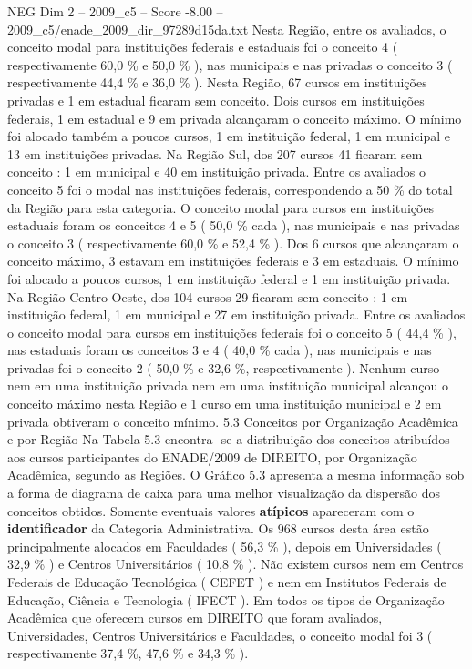 \begin{textsample}{NEG Dim 2 – 2009\_c5 – Score -8.00 – 2009\_c5/enade\_2009\_dir\_97289d15da.txt}
Nesta Região, entre os avaliados, o conceito modal para instituições federais e estaduais foi o conceito 4 ( respectivamente 60,0 \% e 50,0 \% ), nas municipais e nas privadas o conceito 3 ( respectivamente 44,4 \% e 36,0 \% ).
Nesta Região, 67 cursos em instituições privadas e 1 em estadual ficaram sem conceito.
Dois cursos em instituições federais, 1 em estadual e 9 em privada alcançaram o conceito máximo.
O mínimo foi alocado também a poucos cursos, 1 em instituição federal, 1 em municipal e 13 em instituições privadas.
Na Região Sul, dos 207 cursos 41 ficaram sem conceito : 1 em municipal e 40 em instituição privada.
Entre os avaliados o conceito 5 foi o modal nas instituições federais, correspondendo a 50 \% do total da Região para esta categoria.
O conceito modal para cursos em instituições estaduais foram os conceitos 4 e 5 ( 50,0 \% cada ), nas municipais e nas privadas o conceito 3 ( respectivamente 60,0 \% e 52,4 \% ).
Dos 6 cursos que alcançaram o conceito máximo, 3 estavam em instituições federais e 3 em estaduais.
O mínimo foi alocado a poucos cursos, 1 em instituição federal e 1 em instituição privada.
Na Região Centro-Oeste, dos 104 cursos 29 ficaram sem conceito : 1 em instituição federal, 1 em municipal e 27 em instituição privada.
Entre os avaliados o conceito modal para cursos em instituições federais foi o conceito 5 ( 44,4 \% ), nas estaduais foram os conceitos 3 e 4 ( 40,0 \% cada ), nas municipais e nas privadas foi o conceito 2 ( 50,0 \% e 32,6 \%, respectivamente ).
Nenhum curso nem em uma instituição privada nem em uma instituição municipal alcançou o conceito máximo nesta Região e 1 curso em uma instituição municipal e 2 em privada obtiveram o conceito mínimo. 5.3 Conceitos por Organização Acadêmica e por Região Na Tabela 5.3 encontra -se a distribuição dos conceitos atribuídos aos cursos participantes do ENADE/2009 de DIREITO, por Organização Acadêmica, segundo as Regiões.
O Gráfico 5.3 apresenta a mesma informação sob a forma de diagrama de caixa para uma melhor visualização da dispersão dos conceitos obtidos.
Somente eventuais valores \textbf{atípicos} apareceram com o \textbf{identificador} da Categoria Administrativa.
Os 968 cursos desta área estão principalmente alocados em Faculdades ( 56,3 \% ), depois em Universidades ( 32,9 \% ) e Centros Universitários ( 10,8 \% ).
Não existem cursos nem em Centros Federais de Educação Tecnológica ( CEFET ) e nem em Institutos Federais de Educação, Ciência e Tecnologia ( IFECT ).
Em todos os tipos de Organização Acadêmica que oferecem cursos em DIREITO que foram avaliados, Universidades, Centros Universitários e Faculdades, o conceito modal foi 3 ( respectivamente 37,4 \%, 47,6 \% e 34,3 \% ).

\end{textsample}
